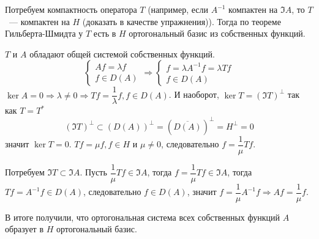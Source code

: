 \documentclass[14pt]{extarticle}
\begin{document}
Потребуем компактность оператора $T$ (например, если $A^{-1}$ компактен на $\Im A$,
то $T$~--- компактен на $H$ (доказать в качестве упражнения)).
Тогда по теореме Гильберта-Шмидта у $T$ есть в $H$ ортогональный базис из
собственных функций.

$T$ и $A$ обладают общей системой собственных функций.
$$
    \left\{
    \begin{array}{l}
        Af = \lambda f\\
        f \in D(A)
    \end{array}
    \right. \Rightarrow
    \left\{
    \begin{array}{l}
        f = \lambda A^{-1}f = \lambda T f\\
        f \in D(A)
    \end{array}
    \right.
$$
$\ker A = 0 \Rightarrow \lambda \ne 0 \Rightarrow Tf = \dfrac{1}{\lambda}f, f \in D(A)$.
И наоборот, $\ker T = (\Im T)^\perp$ так как $T = T^*$
$$
(\Im T)^\perp \subset (D(A))^\perp = \left(\overline{D(A)}\right)^\perp = H^\perp = 0
$$
значит $\ker T = 0$.
$Tf =\mu f, f \in H$ и $\mu \ne 0$, следовательно $f = \dfrac{1}{\mu}Tf$.

Потребуем $\Im T \subset \Im A$.
Пусть $\dfrac{1}{\mu}Tf \in \Im A$, тогда $f = \dfrac{1}{\mu}Tf \in \Im A$, тогда $Tf = A^{-1}f \in 
D(A)$, следовательно $f \in D(A)$, значит $f = \dfrac{1}{\mu}A^{-1}f \Rightarrow Af =\dfrac{1}
{\mu}f$.

В итоге получили, что ортогональная система всех собственных функций $A$ образует
в $H$ ортогональный базис.
\end{document}
